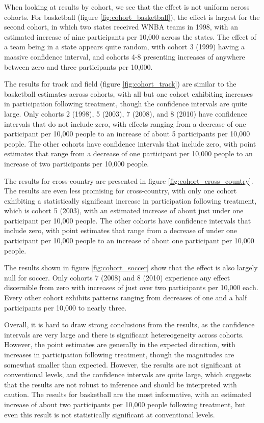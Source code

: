 \documentclass[11pt]{article}
\newcommand{\1}[1]{\mathbb{I}\{#1\}}
\theoremstyle{plain}
\begin{document}
When looking at results by cohort, we see that the effect is not uniform across cohorts. For basketball (figure \ref{fig:cohort_basketball}), the effect is largest for the second cohort, in which two states received WNBA teams in 1998, with an estimated increase of nine participants per 10,000 across the states. The effect of a team being in a state appears quite random, with cohort 3 (1999) having a massive confidence interval, and cohorts 4-8 presenting increases of anywhere between zero and three participants per 10,000.

The results for track and field (figure \ref{fig:cohort_track}) are similar to the basketball estimates across cohorts, with all but one cohort exhibiting increases in participation following treatment, though the confidence intervals are quite large. Only cohorts 2 (1998), 5 (2003), 7 (2008), and 8 (2010) have confidence intervals that do not include zero, with effects ranging from a decrease of one participant per 10,000 people to an increase of about 5 participants per 10,000 people. The other cohorts have confidence intervals that include zero, with point estimates that range from a decrease of one participant per 10,000 people to an increase of two participants per 10,000 people.

The results for cross-country are presented in figure \ref{fig:cohort_cross_country}. The results are even less promising for cross-country, with only one cohort exhibiting a statistically significant increase in participation following treatment, which is cohort 5 (2003), with an estimated increase of about just under one participant per 10,000 people. The other cohorts have confidence intervals that include zero, with point estimates that range from a decrease of under one participant per 10,000 people to an increase of about one participant per 10,000 people. 

The results shown in figure \ref{fig:cohort_soccer} show that the effect is also largely null for soccer. Only cohorts 7 (2008) and 8 (2010) experience any effect discernible from zero with increases of just over two participants per 10,000 each. Every other cohort exhibits patterns ranging from decreases of one and a half participants per 10,000 to nearly three.

Overall, it is hard to draw strong conclusions from the results, as the confidence intervals are very large and there is significant hetereogeneity across cohorts. However, the point estimates are generally in the expected direction, with increases in participation following treatment, though the magnitudes are somewhat smaller than expected. However, the results are not significant at conventional levels, and the confidence intervals are quite large, which suggests that the results are not robust to inference and should be interpreted with caution. The results for basketball are the most informative, with an estimated increase of about two participants per 10,000 people following treatment, but even this result is not statistically significant at conventional levels.
\end{document}
